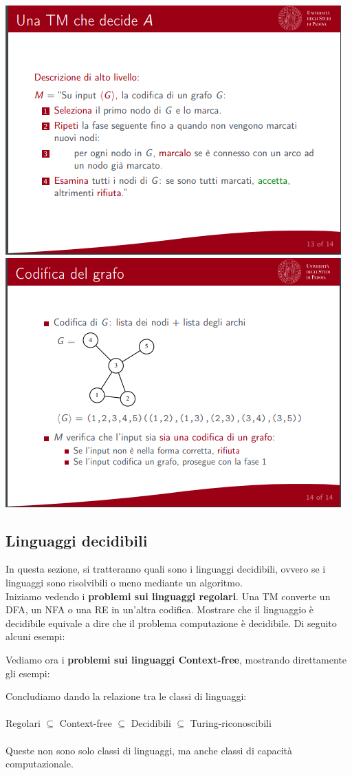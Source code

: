 \documentclass[]{article}
\begin{document}
\begin{center}
					\includegraphics[scale=0.8]{algoritmo4.png}
					\includegraphics[scale=0.8]{algoritmo5.png}
				\end{center}
		\subsection{Linguaggi decidibili}
			In questa sezione, si tratteranno quali sono i linguaggi decidibili, ovvero se i linguaggi sono risolvibili o meno mediante un algoritmo.\\
			Iniziamo vedendo i \textbf{problemi sui linguaggi regolari}. Una TM converte un DFA, un NFA o una RE in un'altra codifica. Mostrare che il linguaggio è decidibile equivale a dire che il problema computazione è decidibile. Di seguito alcuni esempi:
			
			Vediamo ora i \textbf{problemi sui linguaggi Context-free}, mostrando direttamente gli esempi:
			
			Concludiamo dando la relazione tra le classi di linguaggi:\\\\
			Regolari $\subseteq$ Context-free $\subseteq$ Decidibili $\subseteq$ Turing-riconoscibili\\\\
			Queste non sono solo classi di linguaggi, ma anche classi di capacità computazionale.
			
\end{document}
